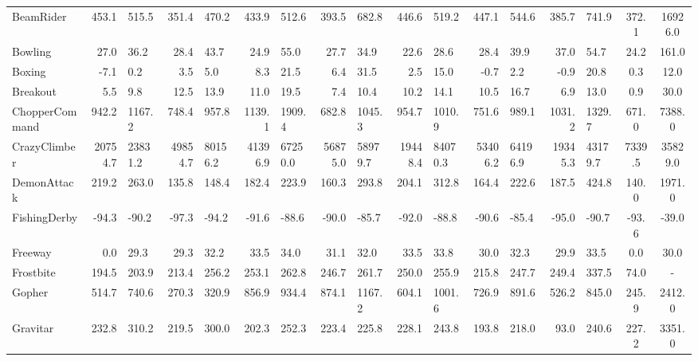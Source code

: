 \begin{landscape}
\begin{changemargin}{0cm}{0cm}
\begin{center}
\begin{table}[!htbp]
\begin{tabular}{l|rl|rl|rl|rl|rl|rl|rl|c|c}
BeamRider      &    453.1 &    515.5 &    351.4 &    470.2 &    433.9 &    512.6 &    393.5 &    682.8 &    446.6 &    519.2 &    447.1 &    544.6 &    385.7 &    741.9 &    372.1 &  16926.0 \\
Bowling        &     27.0 &     36.2 &     28.4 &     43.7 &     24.9 &     55.0 &     27.7 &     34.9 &     22.6 &     28.6 &     28.4 &     39.9 &     37.0 &     54.7 &     24.2 &    161.0 \\
Boxing         &     -7.1 &      0.2 &      3.5 &      5.0 &      8.3 &     21.5 &      6.4 &     31.5 &      2.5 &     15.0 &     -0.7 &      2.2 &     -0.9 &     20.8 &      0.3 &     12.0 \\
Breakout       &      5.5 &      9.8 &     12.5 &     13.9 &     11.0 &     19.5 &      7.4 &     10.4 &     10.2 &     14.1 &     10.5 &     16.7 &      6.9 &     13.0 &      0.9 &     30.0 \\
ChopperCommand &    942.2 &   1167.2 &    748.4 &    957.8 &   1139.1 &   1909.4 &    682.8 &   1045.3 &    954.7 &   1010.9 &    751.6 &    989.1 &   1031.2 &   1329.7 &    671.0 &   7388.0 \\
CrazyClimber   &  20754.7 &  23831.2 &  49854.7 &  80156.2 &  41396.9 &  67250.0 &  56875.0 &  58979.7 &  19448.4 &  84070.3 &  53406.2 &  64196.9 &  19345.3 &  43179.7 &   7339.5 &  35829.0 \\
DemonAttack    &    219.2 &    263.0 &    135.8 &    148.4 &    182.4 &    223.9 &    160.3 &    293.8 &    204.1 &    312.8 &    164.4 &    222.6 &    187.5 &    424.8 &    140.0 &   1971.0 \\
FishingDerby   &    -94.3 &    -90.2 &    -97.3 &    -94.2 &    -91.6 &    -88.6 &    -90.0 &    -85.7 &    -92.0 &    -88.8 &    -90.6 &    -85.4 &    -95.0 &    -90.7 &    -93.6 &    -39.0 \\
Freeway        &      0.0 &     29.3 &     29.3 &     32.2 &     33.5 &     34.0 &     31.1 &     32.0 &     33.5 &     33.8 &     30.0 &     32.3 &     29.9 &     33.5 &      0.0 &     30.0 \\
Frostbite      &    194.5 &    203.9 &    213.4 &    256.2 &    253.1 &    262.8 &    246.7 &    261.7 &    250.0 &    255.9 &    215.8 &    247.7 &    249.4 &    337.5 &     74.0 &      - \\
Gopher         &    514.7 &    740.6 &    270.3 &    320.9 &    856.9 &    934.4 &    874.1 &   1167.2 &    604.1 &   1001.6 &    726.9 &    891.6 &    526.2 &    845.0 &    245.9 &   2412.0 \\
Gravitar       &    232.8 &    310.2 &    219.5 &    300.0 &    202.3 &    252.3 &    223.4 &    225.8 &    228.1 &    243.8 &    193.8 &    218.0 &     93.0 &    240.6 &    227.2 &   3351.0 \\

\end{tabular}
\end{table}
\end{center}
\end{changemargin}
\end{landscape}
